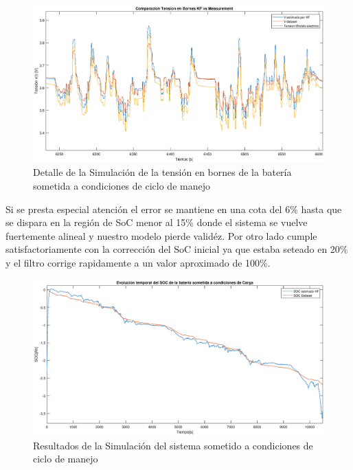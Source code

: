 \documentclass[10pt,a4paper]{article}
\begin{document}
	\begin{figure}[h!]
		\begin{center}
			\includegraphics[width=1\textwidth]{Tension_Sim_zoom.eps}
			\caption{Detalle de la Simulación de la tensión en bornes de la 
                     batería sometida a condiciones de ciclo de manejo}
			\label{Tension_sim_zoom}
		\end{center}
	\end{figure}
	
	\clearpage 

	\noindent Si se presta especial atención el error se mantiene en una cota 
    del 6\% hasta que se dispara en la región de SoC menor al 15\% donde el 
    sistema se vuelve fuertemente alineal y nuestro modelo pierde validéz. 
    Por otro lado cumple satisfactoriamente con la corrección del SoC inicial 
    ya que estaba seteado en 20\% y el filtro corrige rapidamente a un valor 
    aproximado de 100\%. 
	
	\begin{figure}[h!]
		\begin{center}
			\includegraphics[width=1\textwidth]{Drive_Cycle_1_sim.eps}
			\caption{Resultados de la Simulación del sistema sometido a 
                     condiciones de ciclo de manejo}
			\label{Drive_Cycle_1_SoC_sim}
		\end{center}
	\end{figure}
	
\end{document}
